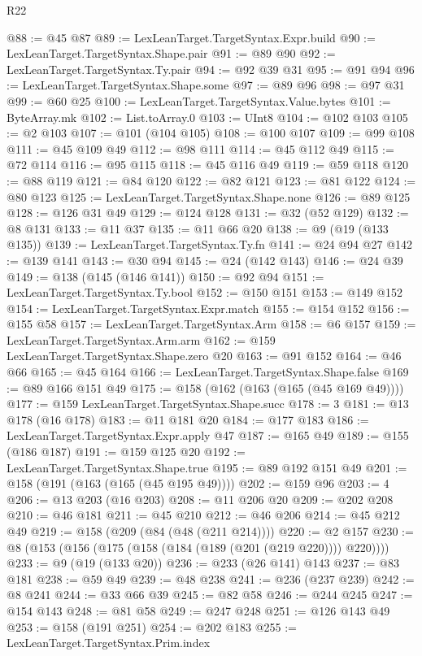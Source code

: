 \begin{lexlean}{R22}
\begin{coremodule}
@88 := @45 @87
@89 := LexLeanTarget.TargetSyntax.Expr.build
@90 := LexLeanTarget.TargetSyntax.Shape.pair
@91 := @89 @90
@92 := LexLeanTarget.TargetSyntax.Ty.pair
@94 := @92 @39 @31
@95 := @91 @94
@96 := LexLeanTarget.TargetSyntax.Shape.some
@97 := @89 @96
@98 := @97 @31
@99 := @60 @25
@100 := LexLeanTarget.TargetSyntax.Value.bytes
@101 := ByteArray.mk
@102 := List.toArray.{0}
@103 := UInt8
@104 := @102 @103
@105 := @2 @103
@107 := @101 (@104 @105)
@108 := @100 @107
@109 := @99 @108
@111 := @45 @109 @49
@112 := @98 @111
@114 := @45 @112 @49
@115 := @72 @114
@116 := @95 @115
@118 := @45 @116 @49
@119 := @59 @118
@120 := @88 @119
@121 := @84 @120
@122 := @82 @121
@123 := @81 @122
@124 := @80 @123
@125 := LexLeanTarget.TargetSyntax.Shape.none
@126 := @89 @125
@128 := @126 @31 @49
@129 := @124 @128
@131 := @32 (@52 @129)
@132 := @8 @131
@133 := @11 @37
@135 := @11 @66 @20
@138 := @9 (@19 (@133 @135))
@139 := LexLeanTarget.TargetSyntax.Ty.fn
@141 := @24 @94 @27
@142 := @139 @141
@143 := @30 @94
@145 := @24 (@142 @143)
@146 := @24 @39
@149 := @138 (@145 (@146 @141))
@150 := @92 @94
@151 := LexLeanTarget.TargetSyntax.Ty.bool
@152 := @150 @151
@153 := @149 @152
@154 := LexLeanTarget.TargetSyntax.Expr.match
@155 := @154 @152
@156 := @155 @58
@157 := LexLeanTarget.TargetSyntax.Arm
@158 := @6 @157
@159 := LexLeanTarget.TargetSyntax.Arm.arm
@162 := @159 LexLeanTarget.TargetSyntax.Shape.zero @20
@163 := @91 @152
@164 := @46 @66
@165 := @45 @164
@166 := LexLeanTarget.TargetSyntax.Shape.false
@169 := @89 @166 @151 @49
@175 := @158 (@162 (@163 (@165 (@45 @169 @49))))
@177 := @159 LexLeanTarget.TargetSyntax.Shape.succ
@178 := 3
@181 := @13 @178 (@16 @178)
@183 := @11 @181 @20
@184 := @177 @183
@186 := LexLeanTarget.TargetSyntax.Expr.apply @47
@187 := @165 @49
@189 := @155 (@186 @187)
@191 := @159 @125 @20
@192 := LexLeanTarget.TargetSyntax.Shape.true
@195 := @89 @192 @151 @49
@201 := @158 (@191 (@163 (@165 (@45 @195 @49))))
@202 := @159 @96
@203 := 4
@206 := @13 @203 (@16 @203)
@208 := @11 @206 @20
@209 := @202 @208
@210 := @46 @181
@211 := @45 @210
@212 := @46 @206
@214 := @45 @212 @49
@219 := @158 (@209 (@84 (@48 (@211 @214))))
@220 := @2 @157
@230 := @8 (@153 (@156 (@175 (@158 (@184 (@189 (@201 (@219 @220)))) @220))))
@233 := @9 (@19 (@133 @20))
@236 := @233 (@26 @141) @143
@237 := @83 @181
@238 := @59 @49
@239 := @48 @238
@241 := @236 (@237 @239)
@242 := @8 @241
@244 := @33 @66 @39
@245 := @82 @58
@246 := @244 @245
@247 := @154 @143
@248 := @81 @58
@249 := @247 @248
@251 := @126 @143 @49
@253 := @158 (@191 @251)
@254 := @202 @183
@255 := LexLeanTarget.TargetSyntax.Prim.index

\end{coremodule}
\end{lexlean}
